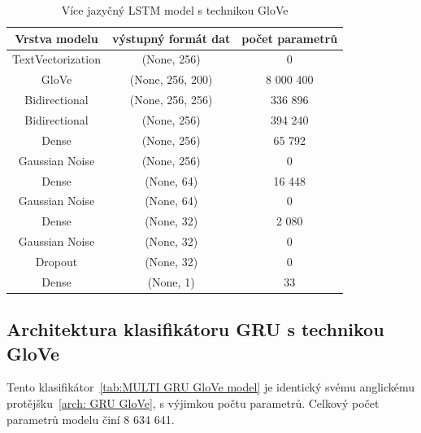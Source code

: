 \begin{table}[H]
	\centering
	\caption{Více jazyčný LSTM model s technikou GloVe}\label{tab:MULTI LSTM GloVe model}
	\begin{tabular}{ c c c }
			\toprule
			Vrstva modelu & výstupný formát dat & počet parametrů\\
			\midrule
            TextVectorization & (None, 256) & 0\\         
            GloVe & (None, 256, 200) & 8 000 400\\   
            Bidirectional & (None, 256, 256) & 336 896\\    
            Bidirectional & (None, 256) & 394 240\\
			Dense & (None, 256) & 65 792\\ 
			Gaussian Noise & (None, 256) & 0\\
            Dense & (None, 64) & 16 448\\ 
			Gaussian Noise & (None, 64) & 0\\
			Dense & (None, 32) & 2 080\\ 
			Gaussian Noise & (None, 32) & 0\\
            Dropout & (None, 32) & 0\\   
            Dense & (None, 1) & 33\\ 
			\midrule
		\end{tabular}
\end{table}


\subsection{Architektura klasifikátoru GRU s technikou GloVe}
Tento klasifikátor~\ref{tab:MULTI GRU GloVe model} je identický svému anglickému protějšku~\ref{arch: GRU GloVe}, s výjimkou počtu parametrů.
Celkový počet parametrů modelu činí 8 634 641.

